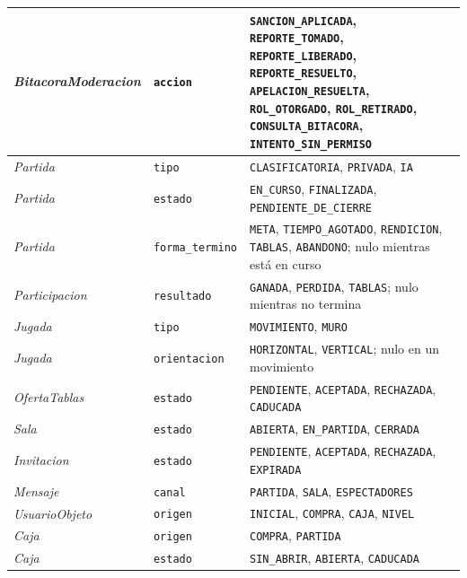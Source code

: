 \begin{center}
\begin{longtable}{|L{0.20\textwidth}|L{0.16\textwidth}|L{0.54\textwidth}|}
\textit{BitacoraModeracion} & \texttt{accion} & \texttt{SANCION\_\allowbreak{}APLICADA}, \texttt{REPORTE\_\allowbreak{}TOMADO}\textdagger{}, \texttt{REPORTE\_\allowbreak{}LIBERADO}\textdagger{}, \texttt{REPORTE\_\allowbreak{}RESUELTO}\textdagger{}, \texttt{APELACION\_\allowbreak{}RESUELTA}\textdagger{}, \texttt{ROL\_\allowbreak{}OTORGADO}\textdagger{}, \texttt{ROL\_\allowbreak{}RETIRADO}\textdagger{}, \texttt{CONSULTA\_\allowbreak{}BITACORA}\textdagger{}, \texttt{INTENTO\_\allowbreak{}SIN\_\allowbreak{}PERMISO}\textdagger{} \\ \hline
\textit{Partida} & \texttt{tipo} & \texttt{CLASIFICATORIA}, \texttt{PRIVADA}, \texttt{IA}\textdagger{} \\ \hline
\textit{Partida} & \texttt{estado} & \texttt{EN\_\allowbreak{}CURSO}, \texttt{FINALIZADA}, \texttt{PENDIENTE\_\allowbreak{}DE\_\allowbreak{}CIERRE} \\ \hline
\textit{Partida} & \texttt{forma\_\allowbreak{}termino} & \texttt{META}, \texttt{TIEMPO\_\allowbreak{}AGOTADO}, \texttt{RENDICION}, \texttt{TABLAS}, \texttt{ABANDONO}; nulo mientras está en curso \\ \hline
\textit{Participacion} & \texttt{resultado} & \texttt{GANADA}, \texttt{PERDIDA}, \texttt{TABLAS}; nulo mientras no termina \\ \hline
\textit{Jugada} & \texttt{tipo} & \texttt{MOVIMIENTO}, \texttt{MURO} \\ \hline
\textit{Jugada} & \texttt{orientacion} & \texttt{HORIZONTAL}, \texttt{VERTICAL}; nulo en un movimiento \\ \hline
\textit{OfertaTablas} & \texttt{estado} & \texttt{PENDIENTE}, \texttt{ACEPTADA}, \texttt{RECHAZADA}, \texttt{CADUCADA} \\ \hline
\textit{Sala} & \texttt{estado} & \texttt{ABIERTA}, \texttt{EN\_\allowbreak{}PARTIDA}, \texttt{CERRADA} \\ \hline
\textit{Invitacion} & \texttt{estado} & \texttt{PENDIENTE}, \texttt{ACEPTADA}, \texttt{RECHAZADA}, \texttt{EXPIRADA} \\ \hline
\textit{Mensaje} & \texttt{canal} & \texttt{PARTIDA}, \texttt{SALA}, \texttt{ESPECTADORES}\textdagger{} \\ \hline
\textit{UsuarioObjeto}\textdagger{} & \texttt{origen} & \texttt{INICIAL}, \texttt{COMPRA}, \texttt{CAJA}, \texttt{NIVEL} \\ \hline
\textit{Caja}\textdagger{} & \texttt{origen} & \texttt{COMPRA}, \texttt{PARTIDA} \\ \hline
\textit{Caja}\textdagger{} & \texttt{estado} & \texttt{SIN\_\allowbreak{}ABRIR}, \texttt{ABIERTA}, \texttt{CADUCADA} \\ \hline

\end{longtable}
\end{center}
